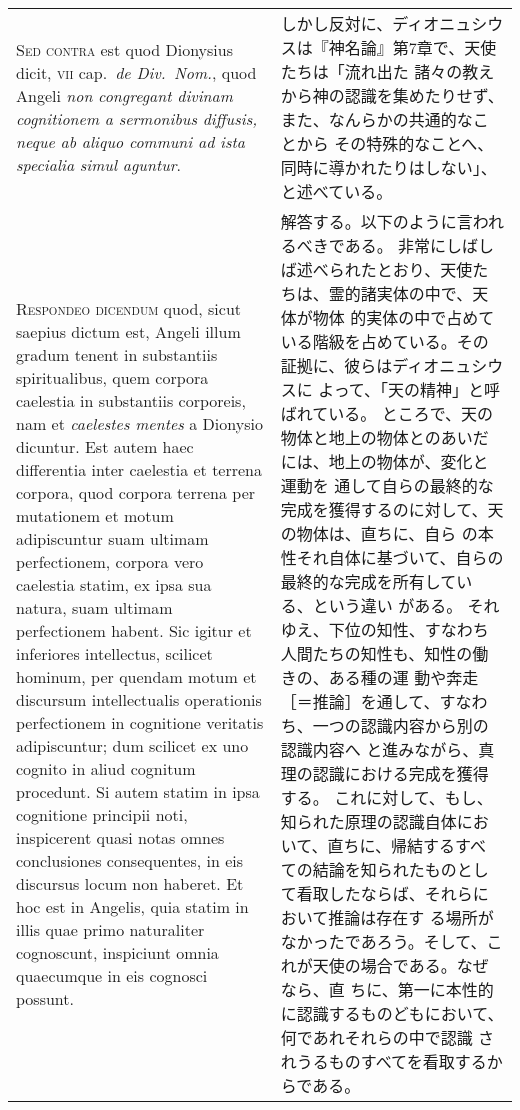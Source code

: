 \documentclass[10pt]{jsarticle} %
\begin{document}
\begin{longtable}{p{21em}p{21em}}
\\



{\scshape Sed contra} est quod Dionysius dicit, {\scshape vii}
 cap.~{\itshape de Div.~Nom.}, quod Angeli {\itshape non congregant divinam cognitionem a
 sermonibus diffusis, neque ab aliquo communi ad ista specialia simul
 aguntur}.


&

しかし反対に、ディオニュシウスは『神名論』第7章で、天使たちは「流れ出た
 諸々の教えから神の認識を集めたりせず、また、なんらかの共通的なことから
 その特殊的なことへ、同時に導かれたりはしない」、と述べている。


\\



{\scshape Respondeo dicendum} quod, sicut saepius dictum
 est, Angeli illum gradum tenent in substantiis spiritualibus, quem
 corpora caelestia in substantiis corporeis, nam et {\itshape caelestes mentes} a
 Dionysio dicuntur. Est autem haec differentia inter caelestia et
 terrena corpora, quod corpora terrena per mutationem et motum
 adipiscuntur suam ultimam perfectionem, corpora vero caelestia statim,
 ex ipsa sua natura, suam ultimam perfectionem habent. Sic igitur et
 inferiores intellectus, scilicet hominum, per quendam motum et
 discursum intellectualis operationis perfectionem in cognitione
 veritatis adipiscuntur; dum scilicet ex uno cognito in aliud cognitum
 procedunt. Si autem statim in ipsa cognitione principii noti,
 inspicerent quasi notas omnes conclusiones consequentes, in eis
 discursus locum non haberet. Et hoc est in Angelis, quia statim in
 illis quae primo naturaliter cognoscunt, inspiciunt omnia quaecumque in
 eis cognosci possunt. 




&

解答する。以下のように言われるべきである。
非常にしばしば述べられたとおり、天使たちは、霊的諸実体の中で、天体が物体
 的実体の中で占めている階級を占めている。その証拠に、彼らはディオニュシウスに
 よって、「天の精神」と呼ばれている。
ところで、天の物体と地上の物体とのあいだには、地上の物体が、変化と運動を
 通して自らの最終的な完成を獲得するのに対して、天の物体は、直ちに、自ら
 の本性それ自体に基づいて、自らの最終的な完成を所有している、という違い
 がある。
それゆえ、下位の知性、すなわち人間たちの知性も、知性の働きの、ある種の運
 動や奔走［＝推論］を通して、すなわち、一つの認識内容から別の認識内容へ
 と進みながら、真理の認識における完成を獲得する。
これに対して、もし、知られた原理の認識自体において、直ちに、帰結するすべ
 ての結論を知られたものとして看取したならば、それらにおいて推論は存在す
 る場所がなかったであろう。そして、これが天使の場合である。なぜなら、直
 ちに、第一に本性的に認識するものどもにおいて、何であれそれらの中で認識
 されうるものすべてを看取するからである。




\end{longtable}
\end{document}
